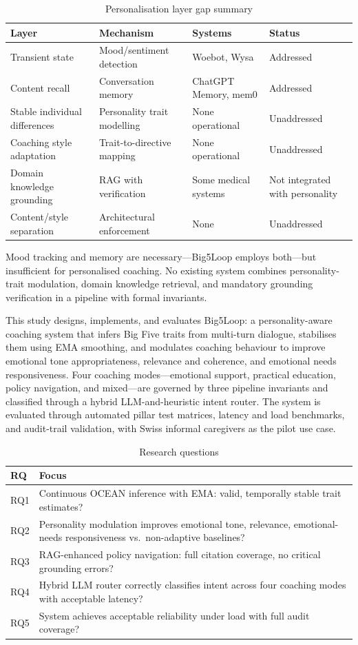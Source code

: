 \documentclass[10pt,a4paper]{report}
\begin{document}
\begin{table}[H]
\centering\small
\caption{Personalisation layer gap summary}
\label{tab:gap}
\begin{tabularx}{\textwidth}{@{}lXlX@{}}
\toprule
Layer & Mechanism & Systems & Status \\
\midrule
Transient state & Mood/sentiment detection & Woebot, Wysa & Addressed \\
Content recall & Conversation memory & ChatGPT Memory, mem0 & Addressed \\
Stable individual differences & Personality trait modelling & None operational & Unaddressed \\
Coaching style adaptation & Trait-to-directive mapping & None operational & Unaddressed \\
Domain knowledge grounding & RAG with verification & Some medical systems & Not integrated with personality \\
Content/style separation & Architectural enforcement & None & Unaddressed \\
\bottomrule
\end{tabularx}
\end{table}

Mood tracking and memory are necessary---Big5Loop employs both---but insufficient for personalised coaching. No existing system combines personality-trait modulation, domain knowledge retrieval, and mandatory grounding verification in a pipeline with formal invariants.

This study designs, implements, and evaluates Big5Loop: a personality-aware coaching system that infers Big Five traits from multi-turn dialogue, stabilises them using EMA smoothing, and modulates coaching behaviour to improve emotional tone appropriateness, relevance and coherence, and emotional needs responsiveness. Four coaching modes---emotional support, practical education, policy navigation, and mixed---are governed by three pipeline invariants and classified through a hybrid LLM-and-heuristic intent router. The system is evaluated through automated pillar test matrices, latency and load benchmarks, and audit-trail validation, with Swiss informal caregivers as the pilot use case.

\begin{table}[H]
\centering\small
\caption{Research questions}
\begin{tabularx}{\textwidth}{@{}lX@{}}
\toprule
RQ & Focus \\
\midrule
RQ1 & Continuous OCEAN inference with EMA: valid, temporally stable trait estimates? \\
RQ2 & Personality modulation improves emotional tone, relevance, emotional-needs responsiveness vs.\ non-adaptive baselines? \\
RQ3 & RAG-enhanced policy navigation: full citation coverage, no critical grounding errors? \\
RQ4 & Hybrid LLM router correctly classifies intent across four coaching modes with acceptable latency? \\
RQ5 & System achieves acceptable reliability under load with full audit coverage? \\
\bottomrule
\end{tabularx}
\end{table}
\end{document}
